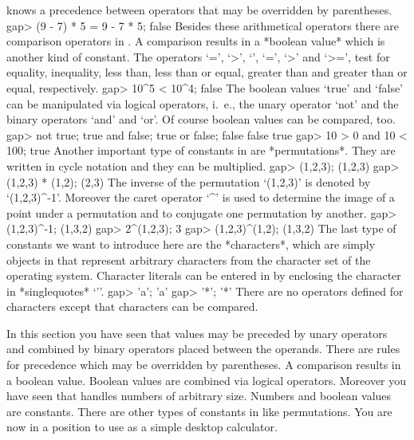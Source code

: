 {\GAP}  knows a  precedence  between operators that may be overridden  by
parentheses.
\beginexample
    gap> (9 - 7) * 5 = 9 - 7  * 5;
    false 
\endexample
Besides these  arithmetical  operators there are comparison  operators in
{\GAP}. A comparison  results in a *boolean value*  which is another kind
of constant.  The operators  `=', `\<>', `\<',  `\<=', `>' and `>=', test
for equality, inequality, less than, less than or equal, greater than and
greater than or equal, respectively.
\beginexample
    gap> 10^5 < 10^4;
    false 
\endexample
The boolean values  `true' and   `false'  can be  manipulated via logical
operators, i.~e., the unary operator `not' and the binary operators `and'
and `or'.  Of course boolean values can be compared, too.
\beginexample
    gap> not true; true and false; true or false;
    false
    false
    true
    gap> 10 > 0 and 10 < 100;
    true 
\endexample
Another important  type of constants in   {\GAP} are *permutations*. They
are written in cycle notation and they can be multiplied.
\beginexample
    gap> (1,2,3);
    (1,2,3)
    gap> (1,2,3) * (1,2);
    (2,3) 
\endexample
The inverse of the   permutation  `(1,2,3)' is denoted   by `(1,2,3)^-1'.
Moreover the caret operator `^' is used to determine the image of a point
under a permutation and to conjugate one permutation by another.
\beginexample
    gap> (1,2,3)^-1;
    (1,3,2)
    gap> 2^(1,2,3);
    3
    gap> (1,2,3)^(1,2);
    (1,3,2) 
\endexample
The    last  type  of   constants  we  want  to introduce    here are the
*characters*, which are simply objects in {\GAP} that represent arbitrary
characters  from  the character set   of the  operating system. Character
literals can  be  entered   in  {\GAP} by  enclosing  the   character  in
*singlequotes* `{'}'.
\beginexample
    gap> 'a';
    'a'
    gap> '*';
    '*' 
\endexample
There are no  operators defined for characters except that characters can
be compared.

In this  section you  have  seen that values  may  be preceded  by  unary
operators  and combined by  binary operators placed between the operands.
There are rules for precedence which may be overridden by parentheses.  A
comparison  results in a boolean value.   Boolean values are combined via
logical operators.  Moreover you have seen that {\GAP} handles numbers of
arbitrary size.   Numbers and boolean   values are constants.   There are
other types of  constants in {\GAP} like permutations.   You are now in a
position to use {\GAP} as a simple desktop calculator.

